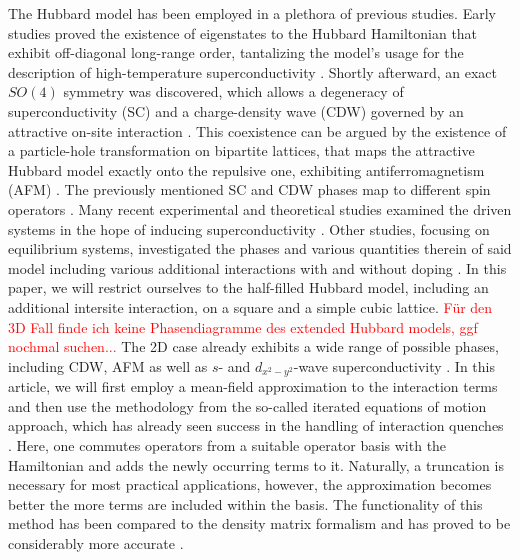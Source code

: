 \documentclass[iicol,sn-mathphys,Numbered]{sn-jnl}%
\theoremstyle{thmstyleone}%
\theoremstyle{thmstyletwo}%
\theoremstyle{thmstylethree}%
\begin{document}
The Hubbard model has been employed in a plethora of previous studies. 
Early studies proved the existence of eigenstates to the Hubbard Hamiltonian that exhibit off-diagonal long-range order,
tantalizing the model's usage for the description of high-temperature superconductivity \cite{yang89}.
Shortly afterward, an exact $SO(4)$ symmetry was discovered,
which allows a degeneracy of superconductivity (SC) and a charge-density wave (CDW) governed by an attractive on-site interaction \cite{yang90}.
This coexistence can be argued by the existence of a particle-hole transformation on bipartite lattices, 
that maps the attractive Hubbard model exactly onto the repulsive one, exhibiting antiferromagnetism (AFM) \cite{Hirsch85}.
The previously mentioned SC and CDW phases map to different spin operators \cite{zitko15,lieb89}.
\newline
Many recent experimental and theoretical studies examined the driven systems in the hope of inducing superconductivity 
\cite{Nicoletti14,Krull14,Moor14,Casandruc15,patel16,sentef17,Buenemann17}.
Other studies, focusing on equilibrium systems, 
investigated the phases and various quantities therein of said model including various additional interactions with and without doping 
\cite{Micnas88,Micnas88b,Micnas89,Dzierzawa92,Kostyrko92,Eriksson95,Staudt00,Onari04,Toschi05,Brackett16,Paki19,romer20,Sushchyev22}.
In this paper, we will restrict ourselves to the half-filled Hubbard model, including an additional intersite interaction, on a square and a simple cubic lattice.
\textcolor{red}{Für den 3D Fall finde ich keine Phasendiagramme des extended Hubbard models, ggf nochmal suchen...}
The 2D case already exhibits a wide range of possible phases, including CDW, AFM as well as $s$- and $d_{x^2 - y^2}$-wave superconductivity
\cite{Micnas88b,Tsuchiura95,Su01,Su04,ha11,Huang13,Jiang22}.
\newline
In this article, we will first employ a mean-field approximation to the interaction terms 
and then use the methodology from the so-called iterated equations of motion approach,
which has already seen success in the handling of interaction quenches \cite{uhrig09,hamerla13,hamerla14,bleicker18}.
Here, one commutes operators from a suitable operator basis with the Hamiltonian and adds the newly occurring terms to it.
Naturally, a truncation is necessary for most practical applications, however, the approximation becomes better the more terms are included within the basis.
The functionality of this method has been compared to the density matrix formalism and has proved to be considerably more accurate \cite{Kalthoff17}.
\end{document}

